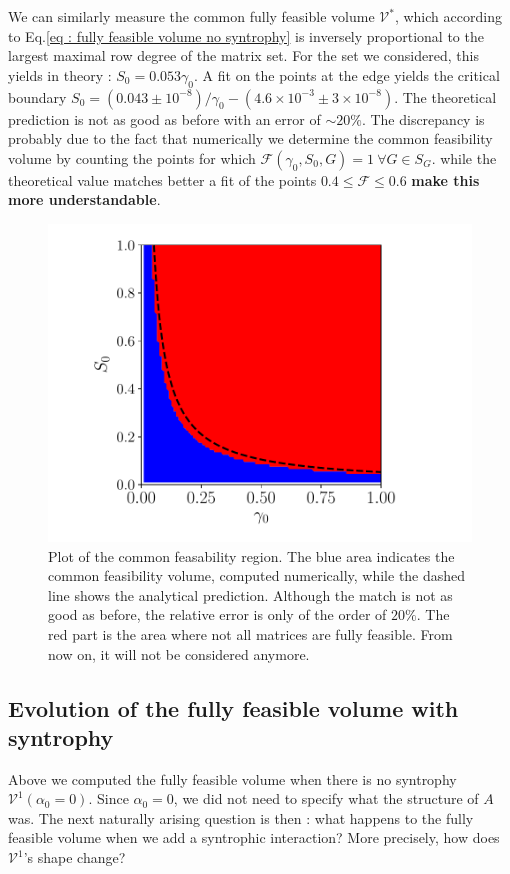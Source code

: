 \documentclass[12pt, titlepage]{report}
\begin{document}
We can similarly measure the common fully feasible volume $\mathcal{V^*}$, which according to Eq.\eqref{eq : fully feasible volume no syntrophy} is inversely proportional to the largest maximal row degree of the matrix set. For the set we considered, this yields in theory : $S_0 = 0.053 \gamma_0$. A fit on the points at the edge yields the critical boundary $S_0 = (0.043 \pm 10^{-8})/\gamma_0 - (4.6 \times 10^{-3} \pm 3 \times 10^{-8})$. The theoretical prediction is not as good as before with an error of $\sim 20 \%$. The discrepancy is probably due to the fact that numerically we determine the common feasibility volume by counting the points for which $\mathcal{F}(\gamma_0, S_0, G)=1 \ \forall G \in S_G$.
while the theoretical value matches better a fit of the points $0.4 \leq \mathcal{F} \leq 0.6$ \textbf{make this more understandable}.
\begin{figure}[h!]
\centering
\includegraphics[width=0.7\linewidth]{Results/common_feasibility_volume}
\caption{Plot of the common feasability region. The blue area indicates the common feasibility volume, computed numerically, while the dashed line shows the analytical prediction. Although the match is not as good as before, the relative error is only of the order of $20 \%$. The red part is the area where not all matrices are fully feasible. From now on, it will not be considered anymore.}
\label{fig : common feasible volume}
\end{figure}

\subsection{Evolution of the fully feasible volume with syntrophy}
Above we computed the fully feasible volume when there is no syntrophy \ie $\mathcal{V}^1(\alpha_0=0)$. Since $\alpha_0=0$, we did not need to specify what the structure of $A$ was. The next naturally arising question is then : what happens to the fully feasible volume when we add a syntrophic interaction? More precisely, how does $\mathcal{V}^1$'s shape change?
\end{document}
